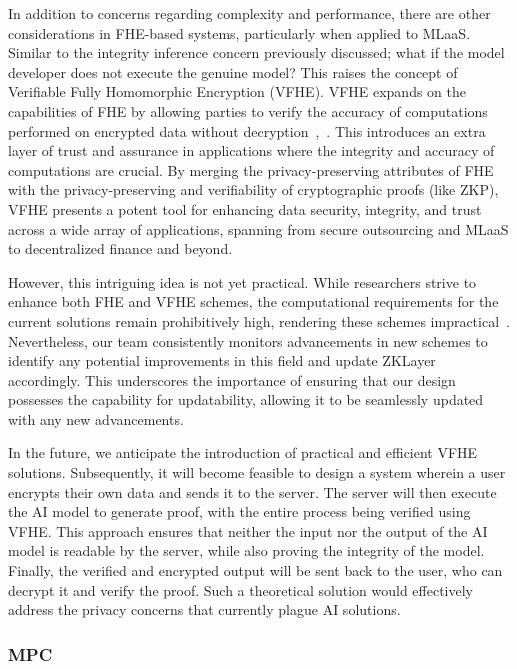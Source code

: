 \documentclass[conference]{IEEEtran}
\begin{document}
In addition to concerns regarding complexity and performance, there are other considerations in FHE-based systems, particularly when applied to MLaaS. Similar to the integrity inference concern previously discussed; what if the model developer does not execute the genuine model? This raises the concept of Verifiable Fully Homomorphic Encryption (VFHE). VFHE expands on the capabilities of FHE by allowing parties to verify the accuracy of computations performed on encrypted data without decryption~\cite{Viand2023VerifiableFH},~\cite{Chatel2022VerifiableEF}. This introduces an extra layer of trust and assurance in applications where the integrity and accuracy of computations are crucial. By merging the privacy-preserving attributes of FHE with the privacy-preserving and verifiability of cryptographic proofs (like ZKP), VFHE presents a potent tool for enhancing data security, integrity, and trust across a wide array of applications, spanning from secure outsourcing and MLaaS to decentralized finance and beyond.

However, this intriguing idea is not yet practical. While researchers strive to enhance both FHE and VFHE schemes, the computational requirements for the current solutions remain prohibitively high, rendering these schemes impractical~\cite{Atapoor2024VerifiableFV}. Nevertheless, our team consistently monitors advancements in new schemes to identify any potential improvements in this field and update ZKLayer accordingly. This underscores the importance of ensuring that our design possesses the capability for updatability, allowing it to be seamlessly updated with any new advancements.

In the future, we anticipate the introduction of practical and efficient VFHE solutions. Subsequently, it will become feasible to design a system wherein a user encrypts their own data and sends it to the server. The server will then execute the AI model to generate proof, with the entire process being verified using VFHE. This approach ensures that neither the input nor the output of the AI model is readable by the server, while also proving the integrity of the model. Finally, the verified and encrypted output will be sent back to the user, who can decrypt it and verify the proof. Such a theoretical solution would effectively address the privacy concerns that currently plague AI solutions.


\subsubsection{MPC}
\end{document}
